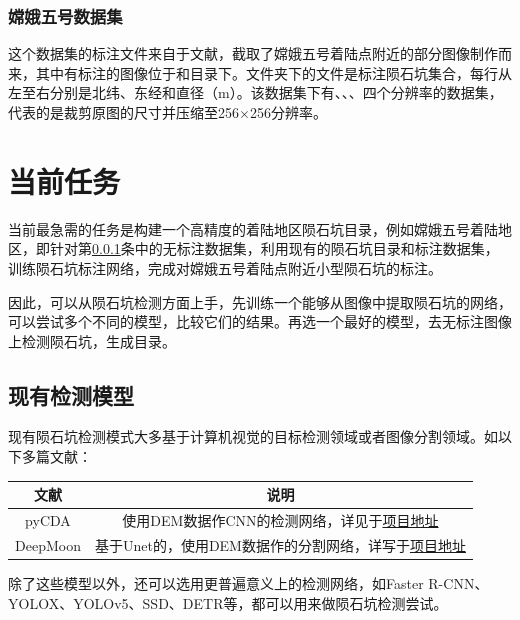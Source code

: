 \documentclass{article}
\begin{document}
\subsubsection{嫦娥五号数据集}
\label{sec:嫦娥五号数据集}
这个数据集的标注文件来自于文献\cite{liuIdentificationLunarCraters2024}，截取了嫦娥五号着陆点附近的部分图像制作而来，其中有标注的图像位于和目录下。文件夹下的文件是标注陨石坑集合，每行从左至右分别是北纬、东经和直径（m）。该数据集下有、、、四个分辨率的数据集，代表的是裁剪原图的尺寸并压缩至256$\times$256分辨率。
\section{当前任务}
当前最急需的任务是构建一个高精度的着陆地区陨石坑目录，例如嫦娥五号着陆地区，即针对第\ref{sec:嫦娥五号数据集}条中的无标注数据集，利用现有的陨石坑目录和标注数据集，训练陨石坑标注网络，完成对嫦娥五号着陆点附近小型陨石坑的标注。\par
因此，可以从陨石坑检测方面上手，先训练一个能够从图像中提取陨石坑的网络，可以尝试多个不同的模型，比较它们的结果。再选一个最好的模型，去无标注图像上检测陨石坑，生成目录。
\subsection{现有检测模型}
现有陨石坑检测模式大多基于计算机视觉的目标检测领域或者图像分割领域。如以下多篇文献：
\begin{table}[H]
  \centering
    \begin{tabular}{c|c}
      \toprule
      文献& 说明\\
      \hline
      pyCDA\cite{cohenCraterDetectionConvolutional2016}&使用DEM数据作CNN的检测网络，详见于\href{https://github.com/AlliedToasters/PyCDA?tab=readme-ov-file}{项目地址}\\
      DeepMoon\cite{yangLunarImpactCrater2020} & 基于Unet的，使用DEM数据作的分割网络，详写于\href{https://github.com/silburt/DeepMoon}{项目地址}\\
      \bottomrule
    \end{tabular}
\end{table}
除了这些模型以外，还可以选用更普遍意义上的检测网络，如Faster R-CNN、YOLOX、YOLOv5、SSD、DETR等，都可以用来做陨石坑检测尝试。
\newpage
\printbibliography[heading=bibliography,title=参考文献]
\end{document}
